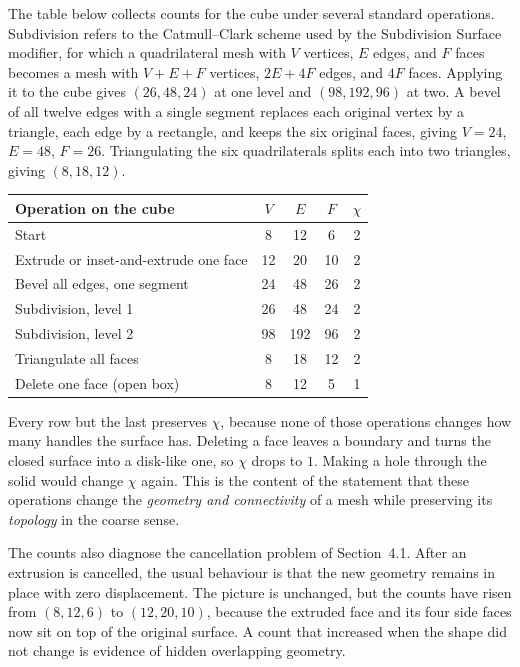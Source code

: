 The table below collects counts for the cube under several standard operations. Subdivision refers to the Catmull--Clark scheme used by the Subdivision Surface modifier, for which a quadrilateral mesh with $V$ vertices, $E$ edges, and $F$ faces becomes a mesh with $V+E+F$ vertices, $2E+4F$ edges, and $4F$ faces. Applying it to the cube gives $(26,48,24)$ at one level and $(98,192,96)$ at two. A bevel of all twelve edges with a single segment replaces each original vertex by a triangle, each edge by a rectangle, and keeps the six original faces, giving $V=24$, $E=48$, $F=26$. Triangulating the six quadrilaterals splits each into two triangles, giving $(8,18,12)$.

\begin{center}
\begin{tabular}{@{}lcccc@{}}
\toprule
Operation on the cube & $V$ & $E$ & $F$ & $\chi$\\
\midrule
Start & 8 & 12 & 6 & 2\\
Extrude or inset-and-extrude one face & 12 & 20 & 10 & 2\\
Bevel all edges, one segment & 24 & 48 & 26 & 2\\
Subdivision, level 1 & 26 & 48 & 24 & 2\\
Subdivision, level 2 & 98 & 192 & 96 & 2\\
Triangulate all faces & 8 & 18 & 12 & 2\\
Delete one face (open box) & 8 & 12 & 5 & 1\\
\bottomrule
\end{tabular}
\end{center}

Every row but the last preserves $\chi$, because none of those operations changes how many handles the surface has. Deleting a face leaves a boundary and turns the closed surface into a disk-like one, so $\chi$ drops to $1$. Making a hole through the solid would change $\chi$ again. This is the content of the statement that these operations change the \emph{geometry and connectivity} of a mesh while preserving its \emph{topology} in the coarse sense.

The counts also diagnose the cancellation problem of Section~4.1. After an extrusion is cancelled, the usual behaviour is that the new geometry remains in place with zero displacement. The picture is unchanged, but the counts have risen from $(8,12,6)$ to $(12,20,10)$, because the extruded face and its four side faces now sit on top of the original surface. A count that increased when the shape did not change is evidence of hidden overlapping geometry.

